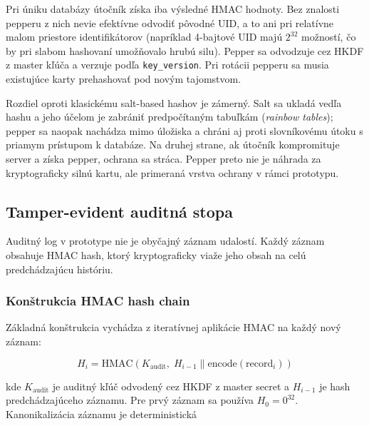 \documentclass[journal,a4paper,onecolumn]{IEEEtran}
\begin{document}
Pri úniku databázy útočník získa iba výsledné HMAC hodnoty. Bez znalosti pepperu z nich nevie efektívne odvodiť pôvodné UID, a to ani pri relatívne malom priestore identifikátorov (napríklad 4-bajtové UID majú $2^{32}$ možností, čo by pri slabom hashovaní umožňovalo hrubú silu)\cite{FIPS1981}. Pepper sa odvodzuje cez HKDF z master kľúča a verzuje podľa \texttt{key\_version}. Pri rotácii pepperu sa musia existujúce karty prehashovať pod novým tajomstvom.

Rozdiel oproti klasickému salt-based hashov je zámerný. Salt sa ukladá vedľa hashu a jeho účelom je zabrániť predpočítaným tabuľkám (\emph{rainbow tables}); pepper sa naopak nachádza mimo úložiska a chráni aj proti slovníkovému útoku s priamym prístupom k databáze. Na druhej strane, ak útočník kompromituje server a získa pepper, ochrana sa stráca. Pepper preto nie je náhrada za kryptograficky silnú kartu, ale primeraná vrstva ochrany v rámci prototypu.

\subsection{Tamper-evident auditná stopa}

Auditný log v prototype nie je obyčajný záznam udalostí. Každý záznam obsahuje HMAC hash, ktorý kryptograficky viaže jeho obsah na celú predchádzajúcu históriu.

\subsubsection{Konštrukcia HMAC hash chain}

Základná konštrukcia vychádza z iteratívnej aplikácie HMAC na každý nový záznam:

\begin{equation}
H_i = \mathrm{HMAC}(K_{\text{audit}},\; H_{i-1} \parallel \mathrm{encode}(\text{record}_i))
\end{equation}

kde $K_{\text{audit}}$ je auditný kľúč odvodený cez HKDF z master secret a $H_{i-1}$ je hash predchádzajúceho záznamu. Pre prvý záznam sa používa $H_0 = 0^{32}$. Kanonikalizácia záznamu je deterministická

\end{document}
